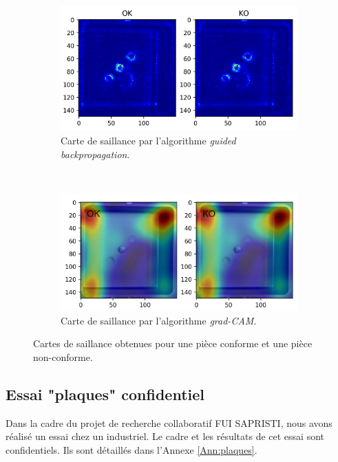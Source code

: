 \begin{figure}[hb!]
	\centering
	\begin{subfigure}[c]{0.63\textwidth}
		\includegraphics[width=\textwidth]{../Chap5/Figures/visualize_saliency_more_guided.png}
		\caption{Carte de saillance par l'algorithme \textit{guided backpropagation}.}
	\end{subfigure}
	\\
	\bigskip
	\begin{subfigure}[c]{0.63\textwidth}
		\includegraphics[width=\textwidth]{../Chap5/Figures/visualize_saliency_grad-CAM_relu.png}
		\caption{Carte de saillance par l'algorithme \textit{grad-CAM}.}
	\end{subfigure}
	\caption{Cartes de saillance obtenues pour une pièce conforme et une pièce non-conforme.}
	\label{fig:saliency}
\end{figure}

\subsection{Essai "plaques" confidentiel}
Dans la cadre du projet de recherche collaboratif FUI SAPRISTI, nous avons réalisé un essai chez un industriel.
Le cadre et les résultats de cet essai sont confidentiels.
Ils sont détaillés dans l'Annexe \ref{Ann:plaques}.

